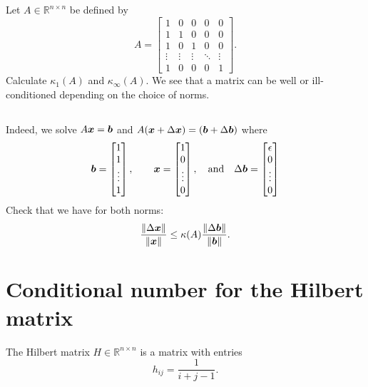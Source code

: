 \documentclass[11pt,letterpaper]{article}
\begin{document}
\subsection{}
Let $A \in \mathbb{R}^{n\times n}$ be defined by
\begin{equation*}
    A = %
    \begin{bmatrix}
      1      & 0      & 0      & 0      &  0      \\ 
      1      & 1      & 0      & 0      &  0      \\
      1      & 0      & 1      & 0      &  0      \\
      \vdots & \vdots & \vdots & \ddots &  \vdots \\
      1      & 0      & 0      & 0      &  1
    \end{bmatrix}.
\end{equation*}
Calculate $\kappa_1(A)$ and $\kappa_\infty(A)$. We see that a matrix can be well or ill-conditioned depending on the choice of norms.

\subsection{}
Indeed, we solve $A\boldsymbol{x} = \boldsymbol{b}$ and $A(\boldsymbol{x}+\Delta \boldsymbol{x}) = (\boldsymbol{b}+\Delta \boldsymbol{b})$ where
\begin{align*}
    \boldsymbol{b} = \begin{bmatrix}
    1\\1\\\vdots\\1
    \end{bmatrix},\qquad \boldsymbol{x} = \begin{bmatrix}
    1\\0\\\vdots\\0
    \end{bmatrix},\quad \mbox{and} \quad \Delta\boldsymbol{b} = \begin{bmatrix}
    \epsilon\\0\\\vdots\\0
    \end{bmatrix}
\end{align*}
Check that we have for both norms:
\begin{align*}
    \frac{\left\Vert \Delta\boldsymbol{x} \right\Vert}{\left\Vert \boldsymbol{x} \right\Vert} \leq \kappa(A)\frac{\left\Vert \Delta\boldsymbol{b} \right\Vert}{\left\Vert \boldsymbol{b} \right\Vert}.
\end{align*}

\section{Conditional number for the Hilbert matrix}  
The Hilbert matrix $H\in \mathbb R^{n\times n}$ is a matrix with
  entries
  $$
  h_{ij} = \frac{1}{i+j-1}.
  $$ 
\end{document}

